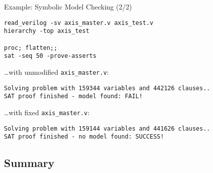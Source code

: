 
\begin{frame}[t, fragile]{Example: Symbolic Model Checking (2/2)}
\begin{lstlisting}[basicstyle=\ttfamily\fontsize{8pt}{10pt}\selectfont, language=ys, frame=single]
read_verilog -sv axis_master.v axis_test.v
hierarchy -top axis_test

proc; flatten;;
sat -seq 50 -prove-asserts
\end{lstlisting}

\bigskip
\dots with unmodified {\tt axis\_master.v}:
\begin{lstlisting}[basicstyle=\ttfamily\fontsize{8pt}{10pt}\selectfont]
Solving problem with 159344 variables and 442126 clauses..
SAT proof finished - model found: FAIL!
\end{lstlisting}

\bigskip
\dots with fixed {\tt axis\_master.v}:
\begin{lstlisting}[basicstyle=\ttfamily\fontsize{8pt}{10pt}\selectfont]
Solving problem with 159144 variables and 441626 clauses..
SAT proof finished - no model found: SUCCESS!
\end{lstlisting}
\end{frame}


\subsection{Summary}

